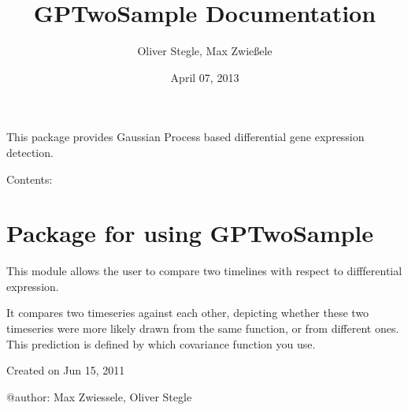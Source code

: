 \documentclass[letterpaper,10pt]{sphinxmanual}
\title{GPTwoSample Documentation}
\date{April 07, 2013}
\author{Oliver Stegle, Max Zwießele}
\begin{document}
\maketitle
\tableofcontents
{}\label{index::doc}


This package provides Gaussian Process based differential gene
expression detection.

Contents:
\label{base:module-gptwosample}

\chapter{Package for using GPTwoSample}
\label{base:package-for-using-gptwosample}\label{base::doc}\label{base:welcome-to-gptwosample}
This module allows the user to compare two timelines with respect to diffferential expression.

It compares two timeseries against each other, depicting whether these two
timeseries were more likely drawn from the same function, or from
different ones. This prediction is defined by which covariance function  you use.

Created on Jun 15, 2011

@author: Max Zwiessele, Oliver Stegle
\end{document}
